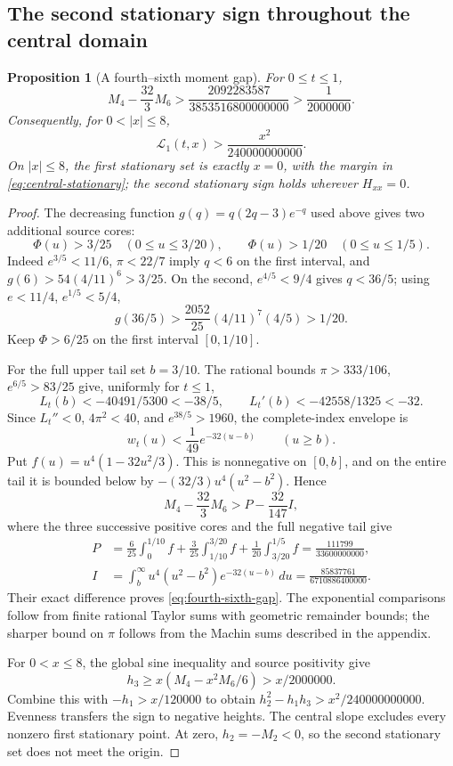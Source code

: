 \documentclass[11pt]{article}
\numberwithin{equation}{section}
\newtheorem{proposition}[theorem]{Proposition}
\theoremstyle{definition}
\theoremstyle{remark}
\newcommand{\Lag}{\mathscr L}
\begin{document}
\subsection{The second stationary sign throughout the central domain}

\begin{proposition}[A fourth--sixth moment gap]
\label{prop:central-fourth-sixth}
For \(0\le t\le1\),
\begin{equation}
 M_4-\frac{32}{3}M_6>
 \frac{2092283587}{3853516800000000}>\frac1{2000000}.
 \label{eq:fourth-sixth-gap}
\end{equation}
Consequently, for \(0<|x|\le8\),
\begin{equation}
 \Lag_1(t,x)>\frac{x^2}{240000000000}.
 \label{eq:central-second-sign}
\end{equation}
On \(|x|\le8\), the first stationary set is exactly \(x=0\),
with the margin in \eqref{eq:central-stationary}; the second stationary
sign holds wherever \(H_{xx}=0\).
\end{proposition}

\begin{proof}
The decreasing function \(g(q)=q(2q-3)e^{-q}\) used above gives
two additional source cores:
\[
 \Phi(u)>3/25\quad(0\le u\le3/20),\qquad
 \Phi(u)>1/20\quad(0\le u\le1/5).
\]
Indeed \(e^{3/5}<11/6\), \(\pi<22/7\) imply \(q<6\)
on the first interval, and
\(g(6)>54(4/11)^6>3/25\). On the second,
\(e^{4/5}<9/4\) gives \(q<36/5\); using
\(e<11/4\), \(e^{1/5}<5/4\),
\[
 g(36/5)>\frac{2052}{25}(4/11)^7(4/5)>1/20.
\]
Keep \(\Phi>6/25\) on the first interval \([0,1/10]\).

For the full upper tail set \(b=3/10\). The rational bounds
\(\pi>333/106\), \(e^{6/5}>83/25\) give, uniformly for \(t\le1\),
\[
 L_t(b)<-40491/5300<-38/5,\qquad
 L_t'(b)<-42558/1325<-32.
\]
Since \(L_t''<0\), \(4\pi^2<40\), and \(e^{38/5}>1960\),
the complete-index envelope is
\[
 w_t(u)<\frac1{49}e^{-32(u-b)}\qquad(u\ge b).
\]
Put \(f(u)=u^4(1-32u^2/3)\). This is nonnegative on \([0,b]\),
and on the entire tail it is bounded below by
\(-(32/3)u^4(u^2-b^2)\). Hence
\[
 M_4-\frac{32}{3}M_6>P-\frac{32}{147}I,
\]
where the three successive positive cores and the full negative tail give
\begin{align*}
 P&=\frac6{25}\int_0^{1/10}f
   +\frac3{25}\int_{1/10}^{3/20}f
   +\frac1{20}\int_{3/20}^{1/5}f
   =\frac{111799}{33600000000},\\
 I&=\int_b^\infty u^4(u^2-b^2)e^{-32(u-b)}\,du
   =\frac{85837761}{6710886400000}.
\end{align*}
Their exact difference proves \eqref{eq:fourth-sixth-gap}.
The exponential comparisons follow from finite rational Taylor sums
with geometric remainder bounds; the sharper bound on \(\pi\)
follows from the Machin sums described in the appendix.

For \(0<x\le8\), the global sine inequality and source positivity give
\[
 h_3\ge x(M_4-x^2M_6/6)>x/2000000.
\]
Combine this with \(-h_1>x/120000\) to obtain
\(h_2^2-h_1h_3>x^2/240000000000\). Evenness transfers the sign
to negative heights. The central slope excludes every nonzero first
stationary point. At zero, \(h_2=-M_2<0\), so the second stationary
set does not meet the origin.
\end{proof}
\end{document}
